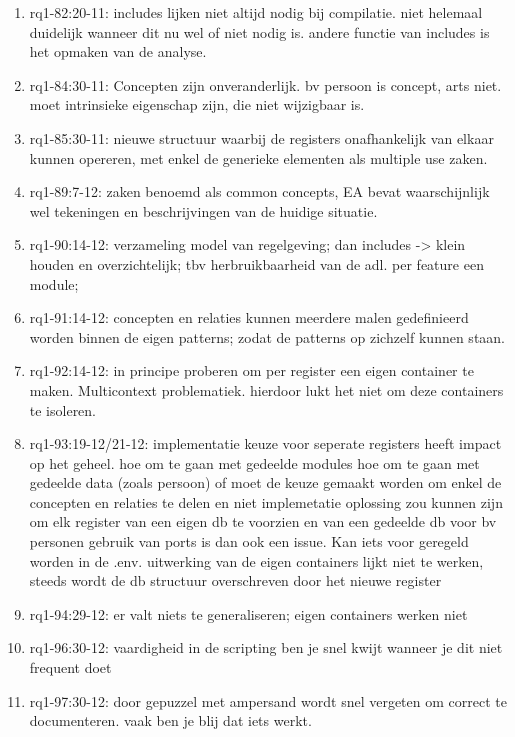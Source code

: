 \begin{enumerate}
    \item rq1-82:20-11: includes lijken niet altijd nodig bij compilatie. niet helemaal duidelijk wanneer dit nu wel of niet nodig is. 
    andere functie van includes is het opmaken van de analyse.
    \item rq1-84:30-11: Concepten zijn onveranderlijk. bv persoon is concept, arts niet. 
    moet intrinsieke eigenschap zijn, die niet wijzigbaar is.
    \item rq1-85:30-11: nieuwe structuur waarbij de registers onafhankelijk van elkaar kunnen opereren, met enkel de generieke elementen als multiple use zaken.
    \item rq1-89:7-12: zaken benoemd als common concepts, EA bevat waarschijnlijk wel tekeningen en beschrijvingen van de huidige situatie.
    \item rq1-90:14-12: verzameling model van regelgeving; dan includes -> klein houden en overzichtelijk; tbv herbruikbaarheid van de adl.
    per feature een module;
    \item rq1-91:14-12: concepten en relaties kunnen meerdere malen gedefinieerd worden binnen de eigen patterns; zodat de patterns op zichzelf kunnen staan.
    \item rq1-92:14-12: in principe proberen om per register een eigen container te maken. Multicontext problematiek. 
    hierdoor lukt het niet om deze containers te isoleren. 
    \item rq1-93:19-12/21-12: implementatie keuze voor seperate registers heeft impact op het geheel.
    hoe om te gaan met gedeelde modules
    hoe om te gaan met gedeelde data (zoals persoon)
    of moet de keuze gemaakt worden om enkel de concepten en relaties te delen en niet implemetatie
    oplossing zou kunnen zijn om elk register van een eigen db te voorzien en van een gedeelde db voor bv personen
    gebruik van ports is dan ook een issue. Kan iets voor geregeld worden in de .env.
    uitwerking van de eigen containers lijkt niet te werken, steeds wordt de db structuur overschreven door het nieuwe register
    \item rq1-94:29-12: er valt niets te generaliseren; eigen containers werken niet
    \item rq1-96:30-12: vaardigheid in de scripting ben je snel kwijt wanneer je dit niet frequent doet
    \item rq1-97:30-12: door gepuzzel met ampersand wordt snel vergeten om correct te documenteren. vaak ben je blij dat iets werkt.
\end{enumerate}

